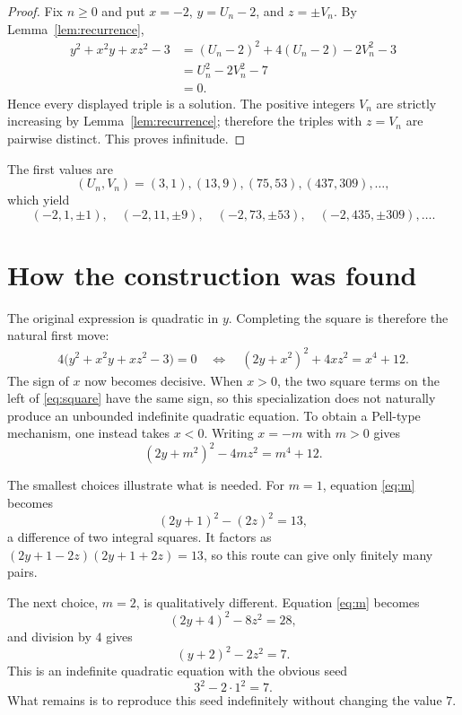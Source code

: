 \documentclass[11pt]{article}
\theoremstyle{remark}
\begin{document}
\begin{proof}
Fix $n\geq0$ and put $x=-2$, $y=U_n-2$, and $z=\pm V_n$.  By Lemma~\ref{lem:recurrence},
\begin{align*}
 y^2+x^2y+xz^2-3
 &=(U_n-2)^2+4(U_n-2)-2V_n^2-3\\
 &=U_n^2-2V_n^2-7\\
 &=0.
\end{align*}
Hence every displayed triple is a solution.  The positive integers $V_n$ are strictly increasing by Lemma~\ref{lem:recurrence}; therefore the triples with $z=V_n$ are pairwise distinct.  This proves infinitude.
\end{proof}

The first values are
\[
 (U_n,V_n)=(3,1),(13,9),(75,53),(437,309),\ldots,
\]
which yield
\[
 (-2,1,\pm1),\quad
 (-2,11,\pm9),\quad
 (-2,73,\pm53),\quad
 (-2,435,\pm309),\ldots.
\]

\section{How the construction was found}\label{sec:discovery}

The original expression is quadratic in $y$.  Completing the square is therefore the natural first move:
\begin{align}
 4\bigl(y^2+x^2y+xz^2-3\bigr)=0
 \quad\Longleftrightarrow\quad
 (2y+x^2)^2+4xz^2=x^4+12.\label{eq:square}
\end{align}
The sign of $x$ now becomes decisive.  When $x>0$, the two square terms on the left of \eqref{eq:square} have the same sign, so this specialization does not naturally produce an unbounded indefinite quadratic equation.  To obtain a Pell-type mechanism, one instead takes $x<0$.  Writing $x=-m$ with $m>0$ gives
\begin{equation}
 (2y+m^2)^2-4mz^2=m^4+12.\label{eq:m}
\end{equation}

The smallest choices illustrate what is needed.  For $m=1$, equation \eqref{eq:m} becomes
\[
 (2y+1)^2-(2z)^2=13,
\]
a difference of two integral squares.  It factors as
$(2y+1-2z)(2y+1+2z)=13$, so this route can give only finitely many pairs.

The next choice, $m=2$, is qualitatively different.  Equation \eqref{eq:m} becomes
\[
 (2y+4)^2-8z^2=28,
\]
and division by $4$ gives
\begin{equation}
 (y+2)^2-2z^2=7.\label{eq:pell}
\end{equation}
This is an indefinite quadratic equation with the obvious seed
\[
 3^2-2\cdot1^2=7.
\]
What remains is to reproduce this seed indefinitely without changing the value $7$.
\end{document}
